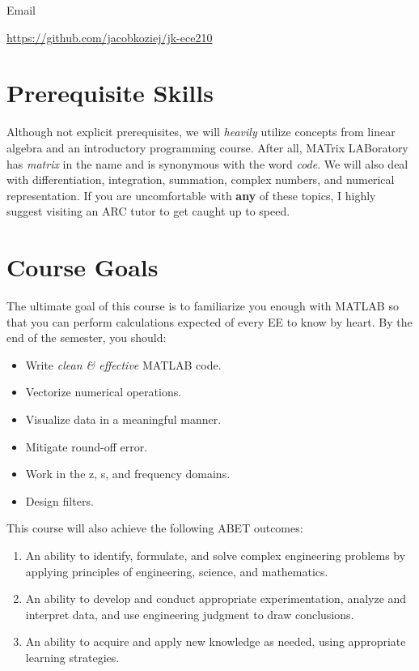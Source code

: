 \documentclass{article}
\begin{document}
 Email

 \url{https://github.com/jacobkoziej/jk-ece210}

\section{Prerequisite Skills}

Although not explicit prerequisites, we will \emph{heavily} utilize
concepts from linear algebra and an introductory programming course.
After all, MATrix  LABoratory has \emph{matrix} in the name and is
synonymous with the word \emph{code}.  We will also deal with
differentiation, integration, summation, complex numbers, and numerical
representation.  If you are uncomfortable with \textbf{any} of these
topics, I highly suggest visiting an ARC tutor to get caught up to
speed.

\section{Course Goals}

The ultimate goal of this course is to familiarize you enough with
MATLAB so that you can perform calculations expected of every EE to know
by heart.  By the end of the semester, you should:

\begin{itemize}
	\item
		Write \emph{clean \& effective} MATLAB code.

	\item
		Vectorize numerical operations.

	\item
		Visualize data in a meaningful manner.

	\item
		Mitigate round-off error.

	\item
		Work in the z, s, and frequency domains.

	\item
		Design filters.
\end{itemize}

This course will also achieve the following ABET outcomes:

\begin{enumerate}
	\slshape

	\item
		An ability to identify, formulate, and solve complex
		engineering problems by applying principles of
		engineering, science, and mathematics.

	\setcounter{enumi}{5}

	\item
		An ability to develop and conduct appropriate
		experimentation, analyze and interpret data, and use
		engineering judgment to draw conclusions.

	\item
		An ability to acquire and apply new knowledge as needed,
		using appropriate learning strategies.
\end{enumerate}
\end{document}

